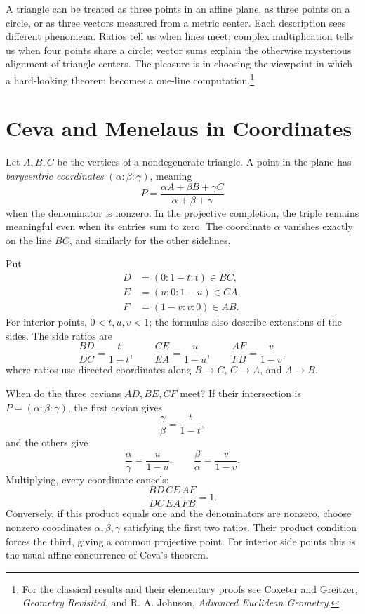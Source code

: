 
A triangle can be treated as three points in an affine plane, as three points on a circle, or as three vectors measured from a metric center. Each description sees different phenomena. Ratios tell us when lines meet; complex multiplication tells us when four points share a circle; vector sums explain the otherwise mysterious alignment of triangle centers. The pleasure is in choosing the viewpoint in which a hard-looking theorem becomes a one-line computation.\footnote{For the classical results and their elementary proofs see Coxeter and Greitzer, \emph{Geometry Revisited}, and R. A. Johnson, \emph{Advanced Euclidean Geometry}.}

\section{Ceva and Menelaus in Coordinates}

Let \(A,B,C\) be the vertices of a nondegenerate triangle. A point in the plane has \emph{barycentric coordinates} \((\alpha:\beta:\gamma)\), meaning
\[
 P=\frac{\alpha A+\beta B+\gamma C}
         {\alpha+\beta+\gamma}
\]
when the denominator is nonzero. In the projective completion, the triple remains meaningful even when its entries sum to zero. The coordinate \(\alpha\) vanishes exactly on the line \(BC\), and similarly for the other sidelines.

Put
\[
\begin{aligned}
 D&=(0:1-t:t)\in BC,\\
 E&=(u:0:1-u)\in CA,\\
 F&=(1-v:v:0)\in AB.
\end{aligned}
\]
For interior points, \(0<t,u,v<1\); the formulas also describe extensions of the sides. The side ratios are
\[
 \frac{BD}{DC}=\frac t{1-t},\qquad
 \frac{CE}{EA}=\frac u{1-u},\qquad
 \frac{AF}{FB}=\frac v{1-v},
\]
where ratios use directed coordinates along \(B\to C\), \(C\to A\), and \(A\to B\).

When do the three cevians \(AD,BE,CF\) meet? If their intersection is \(P=(\alpha:\beta:\gamma)\), the first cevian gives
\[
 \frac{\gamma}{\beta}=\frac t{1-t},
\]
and the others give
\[
 \frac{\alpha}{\gamma}=\frac u{1-u},
 \qquad
 \frac{\beta}{\alpha}=\frac v{1-v}.
\]
Multiplying, every coordinate cancels:
\[
 \boxed{\frac{BD}{DC}\frac{CE}{EA}\frac{AF}{FB}=1.}
\]
Conversely, if this product equals one and the denominators are nonzero, choose nonzero coordinates \(\alpha,\beta,\gamma\) satisfying the first two ratios. Their product condition forces the third, giving a common projective point. For interior side points this is the usual affine concurrence of Ceva's theorem.

